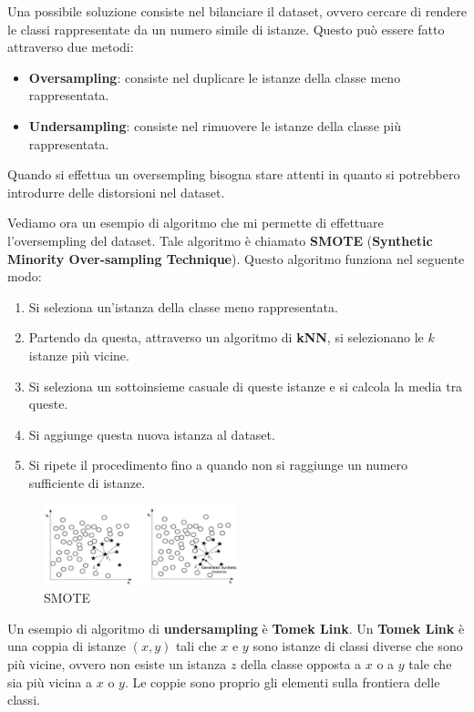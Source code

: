 Una possibile soluzione consiste nel bilanciare il dataset, ovvero cercare di
rendere le classi rappresentate da un numero simile di istanze. Questo può essere
fatto attraverso due metodi:
\begin{itemize}
      \item \textbf{Oversampling}: consiste nel duplicare le istanze della classe
            meno rappresentata.
      \item \textbf{Undersampling}: consiste nel rimuovere le istanze della classe
            più rappresentata.
\end{itemize}
\begin{nota}
      Quando si effettua un oversempling bisogna stare attenti in quanto si
      potrebbero introdurre delle distorsioni nel dataset.
\end{nota}
Vediamo ora un esempio di algoritmo che mi permette di effettuare l'oversempling
del dataset. Tale algoritmo è chiamato \textbf{SMOTE} (\textbf{Synthetic Minority
      Over-sampling Technique}). Questo algoritmo funziona nel seguente modo:
\begin{enumerate}
      \item Si seleziona un'istanza della classe meno rappresentata.
      \item Partendo da questa, attraverso un algoritmo di \textbf{kNN}, si
            selezionano le $k$ istanze più vicine.
      \item Si seleziona un sottoinsieme casuale di queste istanze e si calcola la
            media tra queste.
      \item Si aggiunge questa nuova istanza al dataset.
      \item Si ripete il procedimento fino a quando non si raggiunge un numero
            sufficiente di istanze.
\end{enumerate}
\begin{figure}[!ht]
      \centering
      \includegraphics[width=0.5\textwidth]{./img/Preprocessing/smote.png}
      \caption{SMOTE}
      \label{fig:smote}
\end{figure}

Un esempio di algoritmo di \textbf{undersampling} è \textbf{Tomek Link}. Un
\textbf{Tomek Link} è una coppia di istanze $(x, y)$ tali che $x$ e $y$ sono
istanze di classi diverse che sono più vicine, ovvero non esiste un istanza
$z$ della classe opposta a $x$ o a $y$ tale che sia più vicina a $x$ o $y$. Le
coppie sono proprio gli elementi sulla frontiera delle classi.

